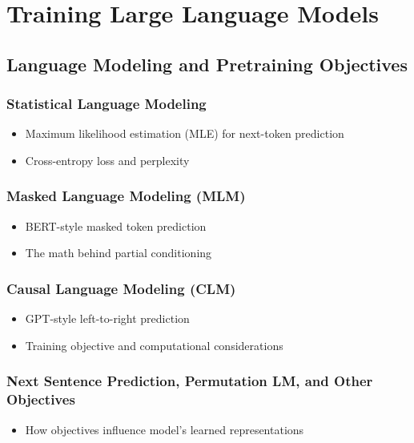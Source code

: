 \documentclass[12pt]{book}
\begin{document}
\part{Training Large Language Models}

\chapter{Language Modeling and Pretraining Objectives}
\section{Statistical Language Modeling}
\begin{itemize}
    \item Maximum likelihood estimation (MLE) for next-token prediction
    \item Cross-entropy loss and perplexity
\end{itemize}

\section{Masked Language Modeling (MLM)}
\begin{itemize}
    \item BERT-style masked token prediction
    \item The math behind partial conditioning
\end{itemize}

\section{Causal Language Modeling (CLM)}
\begin{itemize}
    \item GPT-style left-to-right prediction
    \item Training objective and computational considerations
\end{itemize}

\section{Next Sentence Prediction, Permutation LM, and Other Objectives}
\begin{itemize}
    \item How objectives influence model’s learned representations
\end{itemize}
\end{document}
